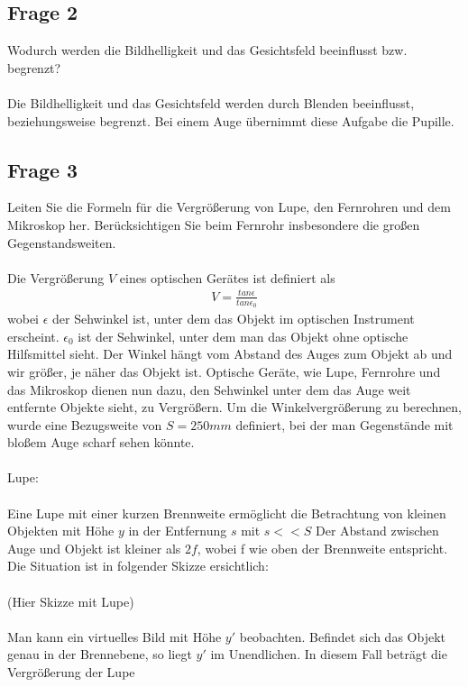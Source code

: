 \documentclass[a4paper,10pt]{scrartcl}
\begin{document}
		\subsection{Frage 2}
			Wodurch werden die Bildhelligkeit und das Gesichtsfeld beeinflusst bzw. begrenzt?\\
			\\
			Die Bildhelligkeit und das Gesichtsfeld werden durch Blenden beeinflusst, beziehungsweise begrenzt. Bei einem Auge übernimmt diese Aufgabe die Pupille.
			
		\subsection{Frage 3}
			Leiten Sie die Formeln für die Vergrößerung von Lupe, den Fernrohren und dem Mikroskop
			her. Berücksichtigen Sie beim Fernrohr insbesondere die großen Gegenstandsweiten.\\
			\\
			Die Vergrößerung \(V\) eines optischen Gerätes ist definiert als
			\begin{align*}
			V=\frac{tan\epsilon}{tan\epsilon_{0}}
			\end{align*}	
			wobei \(\epsilon\) der Sehwinkel ist, unter dem das Objekt im optischen Instrument erscheint. \(\epsilon_{0}\) ist der Sehwinkel, unter dem man das Objekt ohne optische Hilfsmittel sieht. Der Winkel hängt vom Abstand des Auges zum Objekt ab und wir größer, je näher das Objekt ist. Optische Geräte, wie Lupe, Fernrohre und das Mikroskop dienen nun dazu, den Sehwinkel unter dem das Auge weit entfernte Objekte sieht, zu Vergrößern. Um die Winkelvergrößerung zu berechnen, wurde eine Bezugsweite von \(S=250mm\) definiert, bei der man Gegenstände mit bloßem Auge scharf sehen könnte.\\
			\\
			Lupe:\\
			\\
			Eine Lupe mit einer kurzen Brennweite ermöglicht die Betrachtung von kleinen Objekten mit Höhe \(y\) in der Entfernung \(s\) mit \(s<<S\) Der Abstand zwischen Auge und Objekt ist kleiner als \(2f\), wobei f wie oben der Brennweite entspricht. Die Situation ist in folgender Skizze ersichtlich:\\
			\\
			(Hier Skizze mit Lupe)\\
			\\
			Man kann ein virtuelles Bild mit Höhe \(y'\) beobachten. Befindet sich das Objekt genau in der Brennebene, so liegt \(y'\) im Unendlichen. In diesem Fall beträgt die Vergrößerung der Lupe
\end{document}
